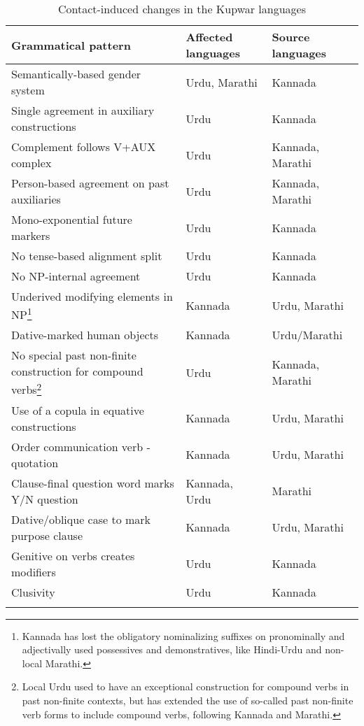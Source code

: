 \documentclass[output=paper,
modfonts
]{langscibook}
\begin{document}
\begin{table}
\caption{Contact-induced changes in the Kupwar languages}  
\label{tab-kupwar}
 \begin{tabular}{p{7cm}| p{2cm} | p{2cm}} 
  \lsptoprule
  Grammatical pattern & Affected languages & Source languages\\ 
  \midrule
 Semantically-based gender system &   Urdu, Marathi & Kannada \\
 Single agreement in auxiliary constructions & Urdu &  Kannada \\
 Complement follows V+AUX complex & Urdu & Kannada, Marathi \\
 Person-based agreement on past auxiliaries  &  Urdu  &  Kannada, Marathi \\
 Mono-exponential future markers & Urdu & Kannada \\
 No tense-based alignment split & Urdu & Kannada \\
 No NP-internal agreement & Urdu & Kannada \\
 Underived modifying elements in NP\footnote{Kannada has lost the obligatory nominalizing suffixes on pronominally and adjectivally used possessives and demonstratives, like Hindi-Urdu and non-local Marathi.} & Kannada & Urdu, Marathi \\
 Dative-marked human objects & Kannada & Urdu/Marathi \\
 No special past non-finite construction for compound verbs\footnote{Local Urdu used to have an exceptional construction for compound verbs in past non-finite contexts, but has extended the use of so-called past non-finite verb forms to include compound verbs, following Kannada and Marathi.} & Urdu & Kannada, Marathi \\
 Use of a copula in equative constructions & Kannada & Urdu, Marathi \\
 Order communication verb - quotation & Kannada & Urdu, Marathi \\
 Clause-final question word marks Y/N question & Kannada, Urdu & Marathi \\
 Dative/oblique case to mark purpose clause & Kannada & Urdu, Marathi \\
 Genitive on verbs creates modifiers & Urdu & Kannada \\
 Clusivity & Urdu & Kannada \\
  \lspbottomrule
 \end{tabular}
\end{table}


\end{document}

